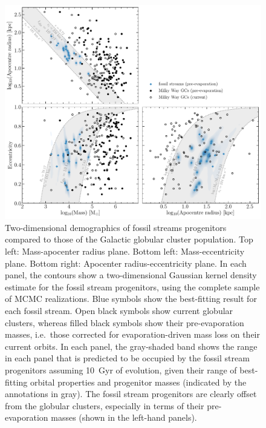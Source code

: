 \documentclass[twocolumn]{aastex63}
\begin{document}
\begin{figure}
\includegraphics[width=\hsize]{figures/distributions_2d_mc.pdf}%
\caption{
\label{fig:kde}
Two-dimensional demographics of fossil streams progenitors compared to those of the Galactic globular cluster population. Top left: Mass-apocenter radius plane. Bottom left: Mass-eccentricity plane. Bottom right: Apocenter radius-eccentricity plane. In each panel, the contours show a two-dimensional Gaussian kernel density estimate for the fossil stream progenitors, using the complete sample of MCMC realizations. Blue symbols show the best-fitting result for each fossil stream. Open black symbols show current globular clusters, whereas filled black symbols show their pre-evaporation masses, i.e.\ those corrected for evaporation-driven mass loss on their current orbits. In each panel, the gray-shaded band shows the range in each panel that is predicted to be occupied by the fossil stream progenitors assuming 10~Gyr of evolution, given their range of best-fitting orbital properties and progenitor masses (indicated by the annotations in gray). The fossil stream progenitors are clearly offset from the globular clusters, especially in terms of their pre-evaporation masses (shown in the left-hand panels).}
\end{figure}
\end{document}
